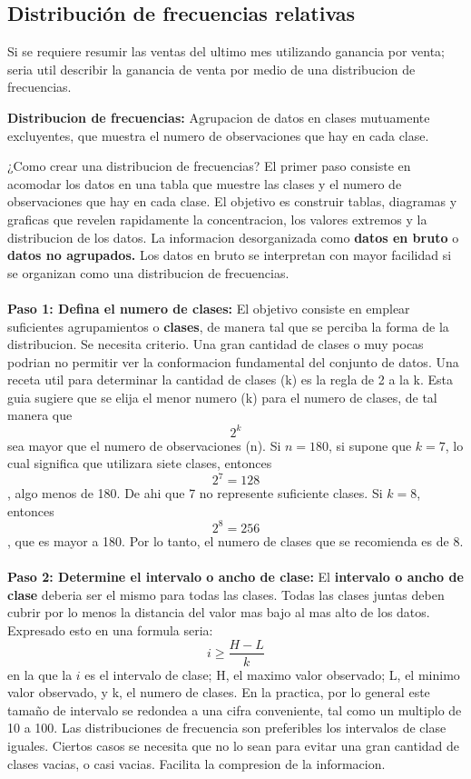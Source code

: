 \documentclass[]{article}
\begin{document}
\subsection{Distribución de frecuencias relativas}
Si se requiere resumir las ventas del ultimo mes utilizando ganancia por venta; seria util describir la ganancia de venta por medio de una distribucion de frecuencias.
\begin{center}
	\textbf{Distribucion de frecuencias: }Agrupacion de datos en clases mutuamente excluyentes, que muestra el numero de observaciones que hay en cada clase.
\end{center}
¿Como crear una distribucion de frecuencias? El primer paso consiste en acomodar los datos en una tabla que muestre las clases y el numero de observaciones que hay en cada clase. El objetivo es construir tablas, diagramas y graficas que revelen rapidamente la concentracion, los valores extremos y la distribucion de los datos. La informacion desorganizada como \textbf{datos en bruto} o \textbf{datos no agrupados.} Los datos en bruto se interpretan con mayor facilidad si se organizan como una distribucion de frecuencias.\\\\
\textbf{Paso 1: Defina el numero de clases: }El objetivo consiste en emplear suficientes agrupamientos o \textbf{clases}, de manera tal que se perciba la forma de la distribucion. Se necesita criterio. Una gran cantidad de clases o muy pocas podrian no permitir ver la conformacion fundamental del conjunto de datos. Una receta util para determinar la cantidad de clases (k) es la regla de 2 a la k. Esta guia sugiere que se elija el menor numero (k) para el numero de clases, de tal manera que \[2^{k}\] sea mayor que el numero de observaciones (n). Si $ n=180 $, si supone que $ k=7 $, lo cual significa que utilizara siete clases, entonces \[ 2^{7}=128 \], algo menos de 180. De ahi que 7 no represente suficiente clases. Si $ k=8 $, entonces \[ 2^{8}=256 \], que es mayor a 180. Por lo tanto, el numero de clases que se recomienda es de 8.\\\\
\textbf{Paso 2: Determine el intervalo o ancho de clase:} El \textbf{intervalo o ancho de clase} deberia ser el mismo para todas las clases. Todas las clases juntas deben cubrir por lo menos la distancia del valor mas bajo al mas alto de los datos. Expresado esto en una formula seria: \[ i\geq\frac{H-L}{k} \] en la que la $ i $ es el intervalo de clase; H, el maximo valor observado; L, el minimo valor observado, y k, el numero de clases. En la practica, por lo general este tamaño de intervalo se redondea a una cifra conveniente, tal como un multiplo de 10 a 100. Las distribuciones de frecuencia son preferibles los intervalos de clase iguales. Ciertos casos se necesita que no lo sean para evitar una gran cantidad de clases vacias, o casi vacias. Facilita la compresion de la informacion.\\\\
\end{document}
